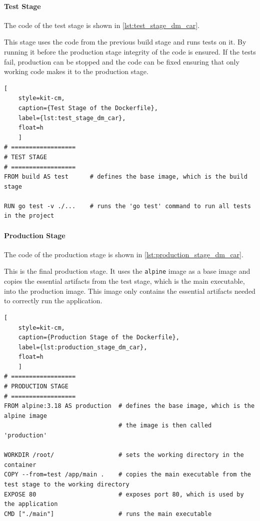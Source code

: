 \paragraph*{Test Stage}
The code of the test stage is shown in \autoref*{lst:test_stage_dm_car}.

This stage uses the code from the previous build stage and runs tests on it.
By running it before the production stage integrity of the code is ensured.
If the tests fail, production can be stopped and the code can be fixed ensuring that only working code makes it to the production stage.

\begin{lstlisting}[
    style=kit-cm,
    caption={Test Stage of the Dockerfile},
    label={lst:test_stage_dm_car},
    float=h
    ]
# ==================
# TEST STAGE
# ==================
FROM build AS test      # defines the base image, which is the build stage

RUN go test -v ./...    # runs the 'go test' command to run all tests in the project
\end{lstlisting}

\paragraph*{Production Stage}
The code of the production stage is shown in \autoref*{lst:production_stage_dm_car}.

This is the final production stage.
It uses the \texttt{alpine} image as a base image and copies the essential artifacts from the test stage, which is the main executable, into the production image.
This image only contains the essential artifacts needed to correctly run the application.

\begin{lstlisting}[
    style=kit-cm,
    caption={Production Stage of the Dockerfile},
    label={lst:production_stage_dm_car},
    float=h
    ]
# ==================
# PRODUCTION STAGE
# ==================
FROM alpine:3.18 AS production  # defines the base image, which is the alpine image
                                # the image is then called 'production'

WORKDIR /root/                  # sets the working directory in the container
COPY --from=test /app/main .    # copies the main executable from the test stage to the working directory
EXPOSE 80                       # exposes port 80, which is used by the application
CMD ["./main"]                  # runs the main executable
\end{lstlisting}

